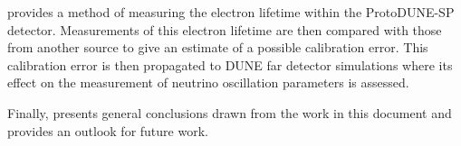  provides a method of measuring the electron lifetime within the ProtoDUNE-SP detector.
Measurements of this electron lifetime are then compared with those from another source to give an estimate of a possible calibration error.
This calibration error is then propagated to DUNE far detector simulations where its effect on the measurement of neutrino oscillation parameters is assessed.

Finally,  presents general conclusions drawn from the work in this document and provides an outlook for future work.
